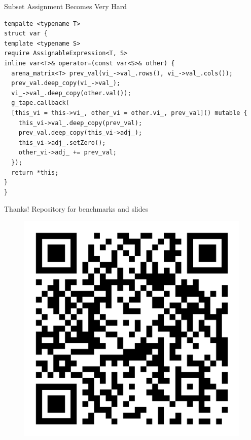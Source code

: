 \documentclass[dvipsnames]{beamer}
\begin{document}
\begin{frame}[fragile]{Subset Assignment Becomes Very Hard}
\begin{verbatim}
tempalte <typename T>
struct var {
template <typename S>
require AssignableExpression<T, S>
inline var<T>& operator=(const var<S>& other) {
  arena_matrix<T> prev_val(vi_->val_.rows(), vi_->val_.cols());
  prev_val.deep_copy(vi_->val_);
  vi_->val_.deep_copy(other.val());
  g_tape.callback(
  [this_vi = this->vi_, other_vi = other.vi_, prev_val]() mutable {
    this_vi->val_.deep_copy(prev_val);
    prev_val.deep_copy(this_vi->adj_);
    this_vi->adj_.setZero();
    other_vi->adj_ += prev_val;
  });
  return *this;
}
}
\end{verbatim}
\end{frame}


\begin{frame}{Thanks!}
Repository for benchmarks and slides
\begin{figure}
\centerline{\includegraphics[scale=.1]{img/qr-code.png}}
\label{fig-qr-code}
\end{figure}
\end{frame}
\end{document}
